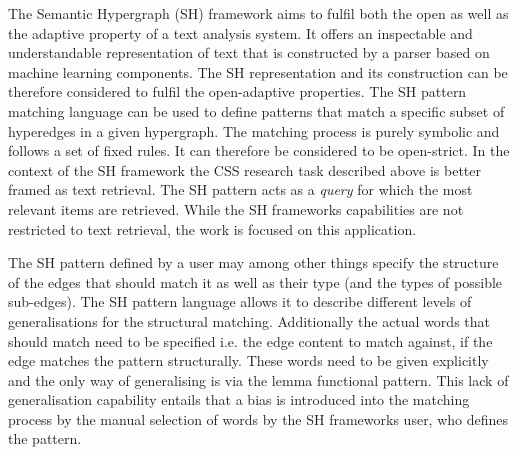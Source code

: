 \documentclass[11pt]{scrreprt}
\begin{document}
The Semantic Hypergraph (SH) framework aims to fulfil both the open as well as the adaptive property of a text analysis system. It offers an inspectable and understandable representation of text that is constructed by a parser based on machine learning components. The SH representation and its construction can be therefore considered to fulfil the open-adaptive properties. The SH pattern matching language can be used to define patterns that match a specific subset of hyperedges in a given hypergraph. The matching process is purely symbolic and follows a set of fixed rules. It can therefore be considered to be open-strict. In the context of the SH framework the CSS research task described above is better framed as text retrieval. The SH pattern acts  as a \textit{query} for which the most relevant items are retrieved. While the SH frameworks capabilities are not restricted to text retrieval, the work is focused on this application.

The SH pattern defined by a user may among other things specify the structure of the edges that should match it as well as their type (and the types of possible sub-edges). The SH pattern language allows it to describe different levels of generalisations for the structural matching. Additionally the actual words that should match need to be specified i.e. the edge content to match against, if the edge matches the pattern structurally. These words need to be given explicitly and the only way of generalising is via the lemma functional pattern. This lack of generalisation capability entails that a bias is introduced into the matching process by the manual selection of words by the SH frameworks user, who defines the pattern.

\end{document}
